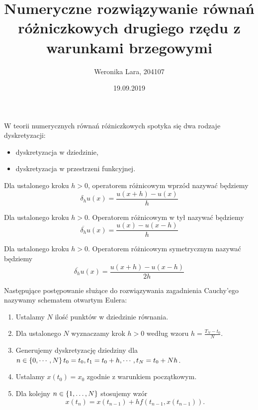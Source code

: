 \documentclass[notheorems]{beamer}
\author{Weronika Lara, 204107}
\title{Numeryczne rozwiązywanie równań różniczkowych drugiego rzędu z warunkami brzegowymi}
\date{19.09.2019}
\institute{Praca licencjacka przygotowana pod opieką dr, mgr inż. Piotra Kowalskiego}
\begin{document}
\begin{frame}
\titlepage
\end{frame}

\begin{frame}
W teorii numerycznych równań różniczkowych spotyka się dwa rodzaje dyskretyzacji:
\begin{itemize}
\item dyskretyzacja w dziedzinie,
\item dyskretyzacja w przestrzeni funkcyjnej.
\end{itemize}
\end{frame}
\begin{frame}
\begin{small}
\begin{definition}\label{operator_wporzd}
Dla ustalonego kroku $h>0 $, operatorem różnicowym wprzód nazywać będziemy 
$$
\delta_h u(x) = \frac{u(x+h) - u(x)}{h}
$$
\end{definition}
\begin{definition}\label{operator_wtyl}
Dla ustalonego kroku $h>0$. Operatorem różnicowym w tył nazywać będziemy 
$$
\overline{\delta_h} u(x) = \frac{u(x)-u(x-h)}{h} 
$$
\end{definition}

\begin{definition}
Dla ustalonego kroku $h>0$. Operatorem różnicowym symetrycznym nazywać będziemy 
$$
\overline{\delta_h} u(x) = \frac{u(x+h)-u(x-h)}{2h} 
$$
\end{definition}
\end{small}
\end{frame}
\begin{frame}
\begin{algorithm}\label{Euler_algoritm}
Następujące postępowanie służące do rozwiązywania zagadnienia Cauchy'ego nazywamy schematem otwartym Eulera:
\begin{enumerate}
\item Ustalamy $N$ ilość punktów w dziedzinie równania. 
\item Dla ustalonego $N$ wyznaczamy krok $h>0$ według wzoru $h=\frac{T_N - t_0}{N}$. 
\item Generujemy dyskretyzację dziedziny dla $ n \in \left\lbrace {0,\cdots,N} \right\rbrace  t_0 = t_0, t_1 = t_0 + h, \cdots, t_N = t_{0}+ Nh$. 
\item Ustalamy $x(t_0) = x_0$ zgodnie z warunkiem początkowym.
\item Dla kolejny $n \in \left\lbrace {1, \ldots, N} \right\rbrace$ stosujemy wzór
$$
x(t_{n}) = x(t_{n-1}) + h f(t_{n-1}, x(t_{n-1})).
$$
\end{enumerate}
\end{algorithm}
\end{frame}
\end{document}
